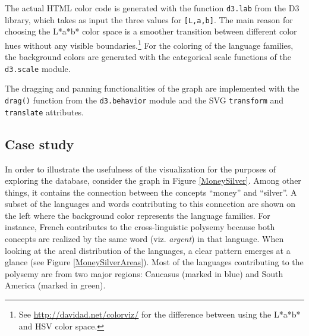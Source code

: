 The actual HTML color code is generated with the function \texttt{d3.lab} from the D3 library, which takes as input the three values for \texttt{[L,a,b]}. The main reason for choosing the L*a*b* color space is a smoother transition between different color hues without any visible boundaries.\footnote{See \url{http://davidad.net/colorviz/} for the difference between using the L*a*b* and HSV color space.} For the coloring of the language families, the background colors are generated with the categorical scale functions of the \texttt{d3.scale} module. 


The  dragging and panning functionalities of the graph are implemented with the \texttt{drag()} function from the \texttt{d3.behavior} module and the SVG \texttt{transform} and \texttt{translate} attributes. 

\subsection{Case study} \label{case study}

In order to illustrate the usefulness of the visualization for the purposes of exploring the database, consider the graph in Figure \ref{MoneySilver}. Among other things, it contains the connection between the concepts ``money'' and ``silver''. A subset of the languages and words contributing to this connection are shown on the left where the background color represents the language families. For instance, French contributes to the cross-linguistic polysemy because both concepts are realized by the same word (viz. \textit{argent}) in that language. When looking at the areal distribution of the languages, a clear pattern emerges at a glance (see Figure \ref{MoneySilverAreas}). Most of the languages contributing to the polysemy are from two major regions: Caucasus (marked in blue) and South America (marked in green).  

